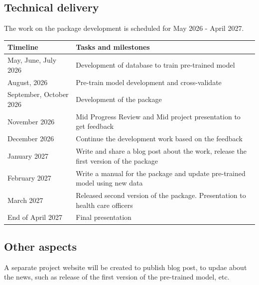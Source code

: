 \documentclass[
]{article}
\begin{document}
\subsection{Technical delivery}\label{technical-delivery}

The work on the package development is scheduled for May 2026 - April
2027.

\begin{longtable}[]{@{}
  >{\raggedright\arraybackslash}p{}
  >{\raggedright\arraybackslash}p{}@{}}
\toprule\noalign{}
\begin{minipage}[b]{\linewidth}\raggedright
Timeline
\end{minipage} & \begin{minipage}[b]{\linewidth}\raggedright
Tasks and milestones
\end{minipage} \\
\midrule\noalign{}
\endhead
\bottomrule\noalign{}
\endlastfoot
May, June, July 2026 & Development of database to train pre-trained
model \\
August, 2026 & Pre-train model development and cross-validate \\
September, October 2026 & Development of the package \\
November 2026 & Mid Progress Review and Mid project presentation to get
feedback \\
December 2026 & Continue the development work based on the feedback \\
January 2027 & Write and share a blog post about the work, release the
first version of the package \\
February 2027 & Write a manual for the package and update pre-trained
model using new data \\
March 2027 & Released second version of the package. Presentation to
health care officers \\
End of April 2027 & Final presentation \\
\end{longtable}

\subsection{Other aspects}\label{other-aspects}

A separate project website will be created to publish blog post, to
updae about the news, such as release of the first version of the
pre-trained model, etc.
\end{document}
